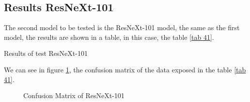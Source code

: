 \documentclass[letterpaper,12pt,openright,oneside]{article}
\begin{document}








\subsection{Results ResNeXt-101}

The second model to be tested is the ResNeXt-101 model, the same as the first model, the results are shown in a table, in this case, the table \ref{tab 41}.

\begin{table}[H]
\centerline{}
\caption{Results of test ResNeXt-101}
\label{tab 41}
\end{table}

We can see in figure \ref{fig 106}, the confusion matrix of the data exposed in the table \ref{tab 41}.

\begin{figure}[H]
\centerline{}
\caption{Confusion Matrix of ResNeXt-101}
\label{fig 106}
\end{figure}


\end{document}
